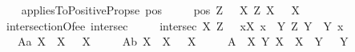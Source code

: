\begin{isabellebody}
\ \ \isamarkupfalse%
\ appliesToPositiveProps{\isacharcolon}{\isacharcolon}{\isachardoublequoteopen}{\isasymup}{\isasymlangle}{\isasymup}{\isasymlangle}{\isasymup}{\isasymlangle}e{\isasymrangle}{\isasymrangle}{\isasymrangle}{\isachardoublequoteclose}\ {\isacharparenleft}{\isachardoublequoteopen}pos{\isachardoublequoteclose}{\isacharparenright}\ \isanewline
\ \ \ \ {\isachardoublequoteopen}pos\ Z\ {\isasymequiv}\ \ \isactrlbold {\isasymforall}X{\isachardot}\ Z\ X\ \isactrlbold {\isasymrightarrow}\ {\isasymP}\ X{\isachardoublequoteclose}\ \ \isanewline
\ \ \isamarkupfalse%
\ intersectionOf{\isacharcolon}{\isacharcolon}{\isachardoublequoteopen}{\isasymup}{\isasymlangle}{\isasymup}{\isasymlangle}e{\isasymrangle}{\isacharcomma}{\isasymup}{\isasymlangle}{\isasymup}{\isasymlangle}e{\isasymrangle}{\isasymrangle}{\isasymrangle}{\isachardoublequoteclose}\ {\isacharparenleft}{\isachardoublequoteopen}intersec{\isachardoublequoteclose}{\isacharparenright}\ \isanewline
\ \ \ \ {\isachardoublequoteopen}intersec\ X\ Z\ {\isasymequiv}\ \ \isactrlbold {\isasymbox}{\isacharparenleft}\isactrlbold {\isasymforall}x{\isachardot}{\isacharparenleft}X\ x\ \isactrlbold {\isasymleftrightarrow}\ {\isacharparenleft}\isactrlbold {\isasymforall}Y{\isachardot}\ {\isacharparenleft}Z\ Y{\isacharparenright}\ \isactrlbold {\isasymrightarrow}\ {\isacharparenleft}Y\ x{\isacharparenright}{\isacharparenright}{\isacharparenright}{\isacharparenright}{\isachardoublequoteclose}\ \ \isanewline
\ \ \isamarkupfalse%
\ \isanewline
\ \ \ A{}a{\isacharcolon}\ {\isachardoublequoteopen}{\isasymlfloor}\isactrlbold {\isasymforall}X{\isachardot}\ {\isasymP}\ {\isacharparenleft}\isactrlbold {\isasymrightharpoondown}X{\isacharparenright}\ \isactrlbold {\isasymrightarrow}\ \isactrlbold {\isasymnot}{\isacharparenleft}{\isasymP}\ X{\isacharparenright}\ {\isasymrfloor}{\isachardoublequoteclose}\ \isanewline
\ \ \ A{}b{\isacharcolon}\ {\isachardoublequoteopen}{\isasymlfloor}\isactrlbold {\isasymforall}X{\isachardot}\ \isactrlbold {\isasymnot}{\isacharparenleft}{\isasymP}\ X{\isacharparenright}\ \isactrlbold {\isasymrightarrow}\ {\isasymP}\ {\isacharparenleft}\isactrlbold {\isasymrightharpoondown}X{\isacharparenright}{\isasymrfloor}{\isachardoublequoteclose}\ \ \isanewline
\ \ \ A{}{\isacharcolon}\ \ {\isachardoublequoteopen}{\isasymlfloor}\isactrlbold {\isasymforall}X\ Y{\isachardot}{\isacharparenleft}{\isasymP}\ X\ \isactrlbold {\isasymand}\ {\isacharparenleft}X\ {\isasymRrightarrow}\ Y{\isacharparenright}{\isacharparenright}\ \isactrlbold {\isasymrightarrow}\ {\isasymP}\ Y{\isasymrfloor}{\isachardoublequoteclose}\ \isanewline

\end{isabellebody}
